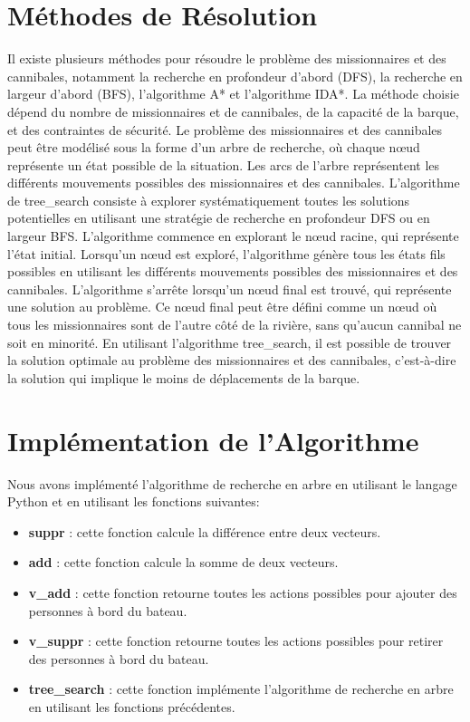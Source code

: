 \documentclass{article}
\begin{document}
\section{Méthodes de Résolution}

Il existe plusieurs méthodes pour résoudre le problème des missionnaires et des cannibales, notamment la recherche en profondeur d'abord (DFS), la recherche en largeur d'abord (BFS), l'algorithme A* et l'algorithme IDA*. La méthode choisie dépend du nombre de missionnaires et de cannibales, de la capacité de la barque, et des contraintes de sécurité.
\newline
Le problème des missionnaires et des cannibales peut être modélisé sous la forme d'un arbre de recherche, où chaque nœud représente un état possible de la situation. Les arcs de l'arbre représentent les différents mouvements possibles des missionnaires et des cannibales. L'algorithme de tree\_search consiste à explorer systématiquement toutes les solutions potentielles en utilisant une stratégie de recherche en profondeur DFS ou en largeur BFS.
\newline
L'algorithme commence en explorant le nœud racine, qui représente l'état initial. Lorsqu'un nœud est exploré, l'algorithme génère tous les états fils possibles en utilisant les différents mouvements possibles des missionnaires et des cannibales. L'algorithme s'arrête lorsqu'un nœud final est trouvé, qui représente une solution au problème. Ce nœud final peut être défini comme un nœud où tous les missionnaires sont de l'autre côté de la rivière, sans qu'aucun cannibal ne soit en minorité.
\newline
En utilisant l'algorithme tree\_search, il est possible de trouver la solution optimale au problème des missionnaires et des cannibales, c'est-à-dire la solution qui implique le moins de déplacements de la barque.


\section{Implémentation de l'Algorithme}
Nous avons implémenté l'algorithme de recherche en arbre en utilisant le langage Python et en utilisant les fonctions suivantes:
\begin{itemize}
\item \textbf{suppr} : cette fonction calcule la différence entre deux vecteurs.
\item \textbf{add} : cette fonction calcule la somme de deux vecteurs.
\item \textbf{v\_add} : cette fonction retourne toutes les actions possibles pour ajouter des personnes à bord du bateau.
\item \textbf{v\_suppr} : cette fonction retourne toutes les actions possibles pour retirer des personnes à bord du bateau.
\item \textbf{tree\_search} : cette fonction implémente l'algorithme de recherche en arbre en utilisant les fonctions précédentes.
\end{itemize}
\end{document}
